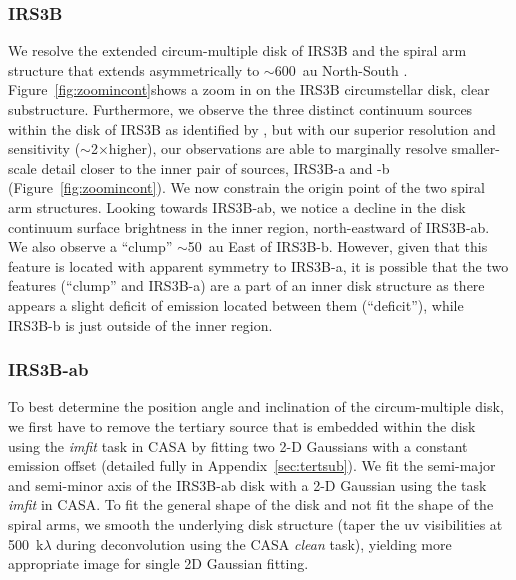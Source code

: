 \documentclass[twocolumn, 12pt]{aastex63}
\newcommand{\ab}{$\sim$}
\begin{document}
\subsubsection{IRS3B}
We resolve the extended circum-multiple disk of IRS3B and the spiral arm structure that extends asymmetrically to \ab600~au North-South  . Figure~\ref{fig:zoomincont}\space shows a zoom in on the IRS3B circumstellar disk,  clear substructure. Furthermore, we observe the three distinct continuum sources within the disk of IRS3B as identified by \citet{2016Natur.538..483T}, but with our superior resolution and sensitivity (\ab2$\times$\space higher), our observations are able to marginally resolve smaller-scale detail closer to the inner pair of sources, IRS3B-a and -b (Figure~\ref{fig:zoomincont}). We now constrain the origin point of the two spiral arm structures. Looking towards IRS3B-ab, we notice a decline in the disk continuum surface brightness in the inner region, north-eastward of IRS3B-ab. We also observe a ``clump'' \ab50~au East of IRS3B-b. However, given that this feature is located with apparent symmetry to IRS3B-a, it is possible that the two features (``clump'' and IRS3B-a) are a part of an inner disk structure as there appears a slight deficit of emission located between them (``deficit''), while IRS3B-b is just outside of the inner region. 

\subsubsection{IRS3B-ab}
To best determine the position angle and inclination of the circum-multiple disk, we first have to remove the tertiary source that is embedded within the disk using the \textit{imfit} task in CASA by fitting two 2-D Gaussians with a constant emission offset (detailed fully in Appendix~\ref{sec:tertsub}). We fit the semi-major and semi-minor axis of the IRS3B-ab disk with a 2-D Gaussian using the task \textit{imfit} in CASA. To fit the general shape of the disk and not fit the shape of the spiral arms, we smooth the underlying disk structure (taper the uv visibilities at 500~k$\lambda$ during deconvolution using the CASA \textit{clean} task), yielding more appropriate image for single 2D Gaussian fitting. 
\end{document}
